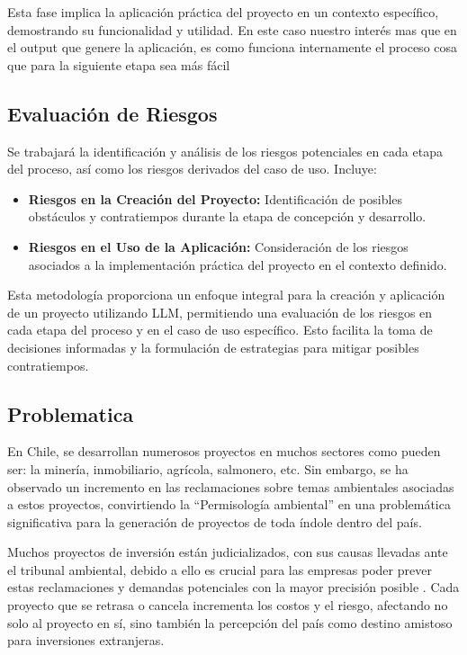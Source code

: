 Esta fase implica la aplicación práctica del proyecto en un contexto específico, demostrando su funcionalidad y utilidad. 
En este caso nuestro interés mas que en el output que genere la aplicación, es como funciona internamente el proceso cosa 
que para la siguiente etapa sea más fácil 

\subsection{Evaluación de Riesgos}

Se trabajará la identificación y análisis de los riesgos potenciales en cada etapa del proceso, así como los riesgos derivados
del caso de uso. Incluye:

\begin{itemize}
    \item \textbf{Riesgos en la Creación del Proyecto:} Identificación de posibles obstáculos y contratiempos durante la etapa de concepción y desarrollo.
    \item \textbf{Riesgos en el Uso de la Aplicación:} Consideración de los riesgos asociados a la implementación práctica del proyecto en el contexto definido.
\end{itemize}

Esta metodología proporciona un enfoque integral para la creación y aplicación de un proyecto utilizando LLM, permitiendo una evaluación de los riesgos en cada etapa del proceso y en el caso de uso específico. Esto facilita la toma de decisiones informadas y la formulación de estrategias para mitigar posibles contratiempos.

\subsection{Problematica}

\par En Chile, se desarrollan numerosos proyectos en muchos sectores como pueden ser: la minería, inmobiliario, agrícola, salmonero, etc. Sin embargo, se ha observado un incremento en las reclamaciones 
sobre temas ambientales asociadas a estos proyectos, convirtiendo la ``Permisología ambiental'' en una problemática significativa para la generación de proyectos de toda índole dentro del país.

\par Muchos proyectos de inversión están judicializados, con sus causas llevadas ante el tribunal ambiental, debido a ello es crucial para las empresas poder prever estas reclamaciones y demandas 
potenciales con la mayor precisión posible \cite{p1}\cite{p2}\cite{p3}. Cada proyecto que se retrasa o cancela incrementa los costos y el riesgo, afectando no solo al proyecto en sí, sino también la percepción del país como 
destino amistoso para inversiones extranjeras.

